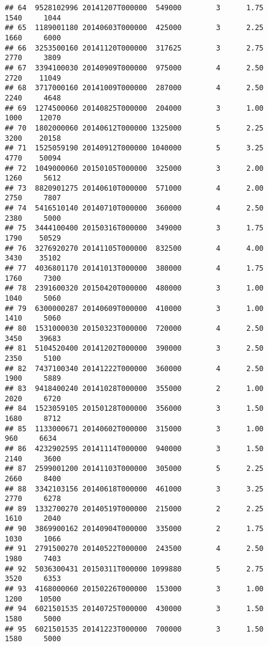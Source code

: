 \documentclass[
]{article}
\begin{document}
\begin{verbatim}
## 64  9528102996 20141207T000000  549000        3      1.75        1540     1044
## 65  1189001180 20140603T000000  425000        3      2.25        1660     6000
## 66  3253500160 20141120T000000  317625        3      2.75        2770     3809
## 67  3394100030 20140909T000000  975000        4      2.50        2720    11049
## 68  3717000160 20141009T000000  287000        4      2.50        2240     4648
## 69  1274500060 20140825T000000  204000        3      1.00        1000    12070
## 70  1802000060 20140612T000000 1325000        5      2.25        3200    20158
## 71  1525059190 20140912T000000 1040000        5      3.25        4770    50094
## 72  1049000060 20150105T000000  325000        3      2.00        1260     5612
## 73  8820901275 20140610T000000  571000        4      2.00        2750     7807
## 74  5416510140 20140710T000000  360000        4      2.50        2380     5000
## 75  3444100400 20150316T000000  349000        3      1.75        1790    50529
## 76  3276920270 20141105T000000  832500        4      4.00        3430    35102
## 77  4036801170 20141013T000000  380000        4      1.75        1760     7300
## 78  2391600320 20150420T000000  480000        3      1.00        1040     5060
## 79  6300000287 20140609T000000  410000        3      1.00        1410     5060
## 80  1531000030 20150323T000000  720000        4      2.50        3450    39683
## 81  5104520400 20141202T000000  390000        3      2.50        2350     5100
## 82  7437100340 20141222T000000  360000        4      2.50        1900     5889
## 83  9418400240 20141028T000000  355000        2      1.00        2020     6720
## 84  1523059105 20150128T000000  356000        3      1.50        1680     8712
## 85  1133000671 20140602T000000  315000        3      1.00         960     6634
## 86  4232902595 20141114T000000  940000        3      1.50        2140     3600
## 87  2599001200 20141103T000000  305000        5      2.25        2660     8400
## 88  3342103156 20140618T000000  461000        3      3.25        2770     6278
## 89  1332700270 20140519T000000  215000        2      2.25        1610     2040
## 90  3869900162 20140904T000000  335000        2      1.75        1030     1066
## 91  2791500270 20140522T000000  243500        4      2.50        1980     7403
## 92  5036300431 20150311T000000 1099880        5      2.75        3520     6353
## 93  4168000060 20150226T000000  153000        3      1.00        1200    10500
## 94  6021501535 20140725T000000  430000        3      1.50        1580     5000
## 95  6021501535 20141223T000000  700000        3      1.50        1580     5000

\end{verbatim}
\end{document}
